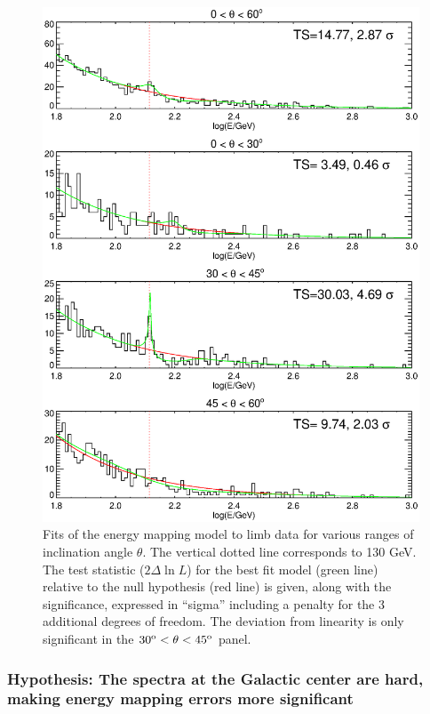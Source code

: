 \documentclass[aps,twocolumn,prd,superscriptaddress,showpacs,nofootinbib,fixfloat]{revtex4}
\newcommand{\degree}{^{\rm o}}
\begin{document}
\begin{figure}
\centering
\includegraphics[width=1.0\linewidth]{plots/limbfits.ps}
\caption{Fits of the energy mapping model to limb data for various ranges of
  inclination angle $\theta$.  The vertical dotted line corresponds to 130
  GeV.  The test statistic ($2\Delta\ln L$) for the best fit model (green
  line) relative to the null hypothesis (red line) is given, along with the
  significance, expressed in ``sigma'' including a penalty for the 3
  additional degrees of freedom.  The deviation from linearity is only
  significant in the $30\degree < \theta < 45\degree$ panel.}
\label{fig:limbfits}
\end{figure}


\subsubsection{Hypothesis: The spectra at the Galactic center are hard, making
energy mapping errors more significant}
\end{document}
